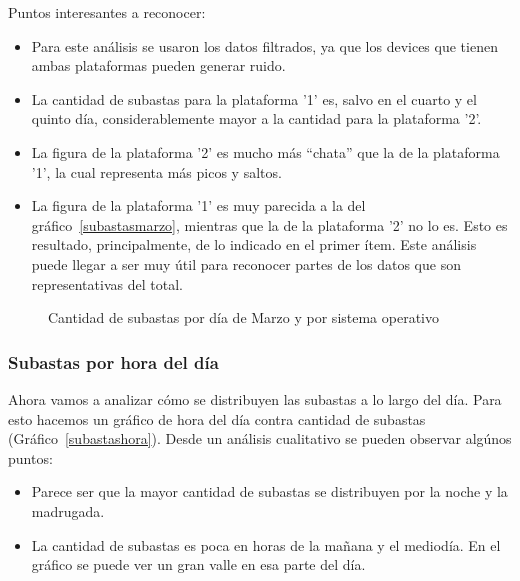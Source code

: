 \documentclass[a4paper, 12pt]{article}
\begin{document}
	 Puntos interesantes a reconocer:

	\begin{itemize}
		\item Para este análisis se usaron los datos filtrados, ya que los devices que tienen ambas plataformas pueden generar ruido.
		\item La cantidad de subastas para la plataforma '1' es, salvo en el cuarto y el quinto día, considerablemente mayor a la cantidad para la plataforma '2'.
		\item La figura de la plataforma '2' es mucho más ``chata'' que la de la plataforma '1', la cual representa más picos y saltos.
		\item La figura de la plataforma '1' es muy parecida a la del gráfico~\ref{subastasmarzo}, mientras que la de la plataforma '2' no lo es. Esto es resultado, principalmente, de lo indicado en el primer ítem. Este análisis puede llegar a ser muy útil para reconocer partes de los datos que son representativas del total.
	\end{itemize}

	\FloatBarrier
	\begin{figure}
			\centering
		   	\caption{Cantidad de subastas por día de Marzo y por sistema operativo}
		   	\label{subastasmarzoSO}
		\end{figure}
	\FloatBarrier

	\subsubsection{Subastas por hora del día}
	 Ahora vamos a analizar cómo se distribuyen las subastas a lo largo del día. Para esto hacemos un gráfico de hora del día contra cantidad de subastas (Gráfico~\ref{subastashora}).\newline
	 Desde un análisis cualitativo se pueden observar algúnos puntos:
	\begin{itemize}
		\item Parece ser que la mayor cantidad de subastas se distribuyen por la noche y la madrugada.
		\item La cantidad de subastas es poca en horas de la mañana y el mediodía. En el gráfico se puede ver un gran valle en esa parte del día.
	\end{itemize}
\end{document}
